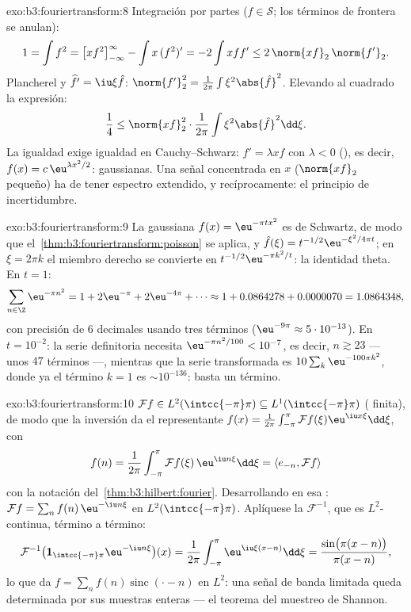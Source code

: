 \begin{solution}{exo:b3:fouriertransform:8}
Integración por partes ($f \in \mathcal S$; los términos de frontera se
anulan):
\[
1 = \int f^2 = \bigl[xf^2\bigr]_{-\infty}^{\infty} - \int
x\,(f^2)' = -2\int xff' \leq 2\,\norm{xf}_2\,\norm{f'}_2 .
\]
Plancherel y $\widehat{f'} = \iu\xi\hat f$:
$\norm{f'}_2^2 = \frac1{2\pi}\int\xi^2\abs{\hat f}^2$. Elevando al
cuadrado la expresión:
\[
\frac14 \leq \norm{xf}_2^2\cdot\frac1{2\pi}
\int\xi^2\abs{\hat f}^2\dd\xi .
\]
La igualdad exige igualdad en Cauchy--Schwarz: $f' =
\lambda xf$ con $\lambda < 0$
(), es decir, $f(x) =
c\,\eu^{\lambda x^2/2}$: gaussianas. Una señal concentrada en $x$
($\norm{xf}_2$ pequeño) ha de tener espectro extendido, y
recíprocamente: el principio de incertidumbre.
\end{solution}

\begin{solution}{exo:b3:fouriertransform:9}
La gaussiana $f(x) = \eu^{-\pi tx^2}$ es de Schwartz, de modo que
el~\cref{thm:b3:fouriertransform:poisson} se aplica, y
$\hat f(\xi) = t^{-1/2}\eu^{-\xi^2/4\pi t}$; en $\xi = 2\pi
k$ el miembro derecho se convierte en $t^{-1/2}\eu^{-\pi k^2/t}$: la
identidad theta. En $t = 1$:
\[
\sum_{n\in\Z}\eu^{-\pi n^2} = 1 + 2\eu^{-\pi} + 2\eu^{-4\pi} +
\cdots \approx 1 + 0.0864278 + 0.0000070 = 1.0864348,
\]
con precisión de $6$ decimales usando tres términos ($\eu^{-9\pi}
\approx 5\cdot10^{-13}$). En $t = 10^{-2}$: la serie definitoria
necesita $\eu^{-\pi n^2/100} < 10^{-7}$, es decir, $n \gtrsim
23$ --- unos $47$ términos ---, mientras que la serie transformada es
$10\sum_k\eu^{-100\pi k^2}$, donde ya el término $k = 1$ es
$\sim 10^{-136}$: basta un término.
\end{solution}

\begin{solution}{exo:b3:fouriertransform:10}
$\mathcal Ff \in L^2(\intcc{-\pi}\pi) \subseteq
L^1(\intcc{-\pi}\pi)$ ( finita),
de modo que la inversión da el representante
 $f(x) =
\frac1{2\pi}\int_{-\pi}^\pi\mathcal Ff(\xi)\eu^{\iu
x\xi}\dd\xi$, con
\[
f(n) = \frac1{2\pi}\int_{-\pi}^{\pi}\mathcal
Ff(\xi)\,\eu^{\iu n\xi}\dd\xi = \langle e_{-n}, \mathcal
Ff\rangle
\]
con la notación del~\cref{thm:b3:hilbert:fourier}. Desarrollando en esa
:
$\mathcal Ff = \sum_nf(n)\,\eu^{-\iu
n\xi}$ en $L^2(\intcc{-\pi}\pi)$. Aplíquese la $\mathcal F^{-1}$, que es
$L^2$-continua, término a término:
\[
\mathcal F^{-1}\bigl(\mathbf
1_{\intcc{-\pi}\pi}\eu^{-\iu n\xi}\bigr)(x)
= \frac1{2\pi}\int_{-\pi}^{\pi}\eu^{\iu\xi(x - n)}\dd\xi
= \frac{\sin\bigl(\pi(x-n)\bigr)}{\pi(x - n)} ,
\]
lo que da $f = \sum_nf(n)\operatorname{sinc}(\cdot - n)$ en $L^2$: una
señal de banda limitada queda determinada por sus muestras enteras ---
el teorema del muestreo de Shannon.
\end{solution}

